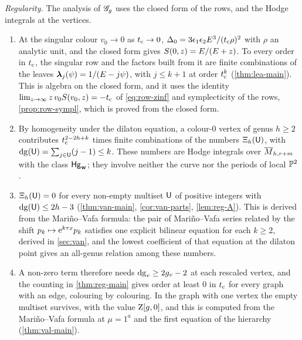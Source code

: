 \emph{Regularity.} The analysis of $\mathscr{G}_g$ uses the closed form of the rows, and the Hodge integrals at the vertices.
\begin{enumerate}
\item At the singular colour $v_0\to 0$ as $t_{\mathrm{c}}\to 0$, $\Delta_0=3\epsilon_1\epsilon_2E^3/(t_{\mathrm{c}}\rho)^2$ with $\rho$ an analytic unit, and the closed form gives $S(0,z)=E/(E+z)$. To every order in $t_{\mathrm{c}}$, the singular row and the factors built from it are finite combinations of the leaves $\boldsymbol{\lambda}_j(\psi)=1/(E-j\psi)$, with $j\leq k+1$ at order $t_{\mathrm{c}}^k$ (\cref{thm:lea-main}). This is algebra on the closed form, and it uses the identity $\lim_{z\to\infty}z\,v_0S(v_0,z)=-t_{\mathrm{c}}$ of \eqref{eq:row-zinf} and symplecticity of the rows, \cref{prop:row-sympl}, which is proved from the closed form.
\item By homogeneity under the dilaton equation, a colour-$0$ vertex of genus $h\geq 2$ contributes $t_{\mathrm{c}}^{2-2h+k}$ times finite combinations of the numbers $\Xi_h(\mathsf{U})$, with $\mathrm{dg}(\mathsf{U})=\sum_{j\in\mathsf{U}}(j-1)\leq k$. These numbers are Hodge integrals over $\overline{M}_{h,r+m}$ with the class $\mathsf{Hg}_{\mathbf{w}}$; they involve neither the curve nor the periods of local $\mathbb{P}^2$.
\item $\Xi_h(\mathsf{U})=0$ for every non-empty multiset $\mathsf{U}$ of positive integers with $\mathrm{dg}(\mathsf{U})\leq 2h-3$ (\cref{thm:van-main}, \cref{cor:van-parts}, \cref{lem:reg-A}). This is derived from the Mari\~no--Vafa formula: the pair of Mari\~no--Vafa series related by the shift $p_k\mapsto\mathrm{e}^{k\tau x}p_k$ satisfies one explicit bilinear equation for each $k\geq 2$, derived in \cref{sec:van}, and the lowest coefficient of that equation at the dilaton point gives an all-genus relation among these numbers.
\item A non-zero term therefore needs $\mathrm{dg}_v\geq 2g_v-2$ at each rescaled vertex, and the counting in \cref{thm:reg-main} gives order at least $0$ in $t_{\mathrm{c}}$ for every graph with an edge, colouring by colouring. In the graph with one vertex the empty multiset survives, with the value $\mathrm{Z}[g,0]$, and this is computed from the Mari\~no--Vafa formula at $\mu=1^a$ and the first equation of the hierarchy (\cref{thm:val-main}).
\end{enumerate}

